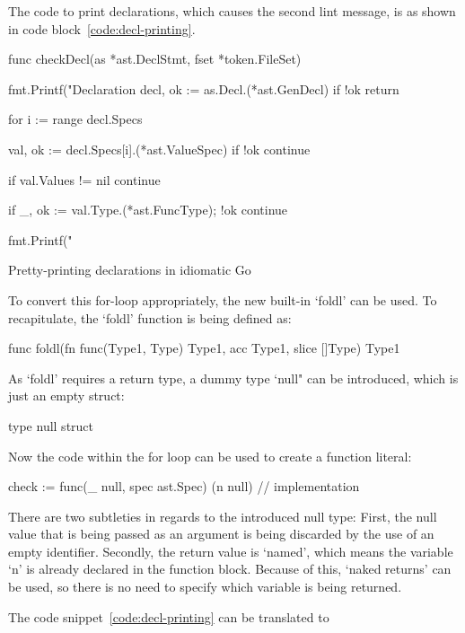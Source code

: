 The code to print declarations, which causes the second lint message, is as shown in code block~\ref{code:decl-printing}.

\begin{code}
\begin{gocode}
func checkDecl(as *ast.DeclStmt, fset *token.FileSet) {
	fmt.Printf("Declaration %
	decl, ok := as.Decl.(*ast.GenDecl)
	if !ok {
		return
	}

	for i := range decl.Specs {
		val, ok := decl.Specs[i].(*ast.ValueSpec)
		if !ok {
			continue
		}

		if val.Values != nil {
			continue
		}

		if _, ok := val.Type.(*ast.FuncType); !ok {
			continue
		}

		fmt.Printf("\tIdent %
	}
}
\end{gocode}
	\caption{Pretty-printing declarations in idiomatic Go\label{code:decl-printing}}
\end{code}
To convert this for-loop appropriately, the new built-in `foldl' can be used.
To recapitulate, the `foldl' function is being defined as:
\begin{gocode}
func foldl(fn func(Type1, Type) Type1, acc Type1, slice []Type) Type1
\end{gocode}
As `foldl' requires a return type, a dummy type `null" can be introduced, which
is just an empty struct:
\begin{gocode}
type null struct{}
\end{gocode}
Now the code within the for loop can be used to create a function literal:
\begin{gocode}
check := func(_ null, spec ast.Spec) (n null) {
	// implementation
}
\end{gocode}
There are two subtleties in regards to the introduced null type:
First, the null value that is being passed as an argument is being discarded
by the use of an empty identifier.
Secondly, the return value is `named', which means the variable `n' is
already declared in the function block. Because of this, `naked returns' can
be used, so there is no need to specify which variable is being returned.

The code snippet~\ref{code:decl-printing} can be translated to

